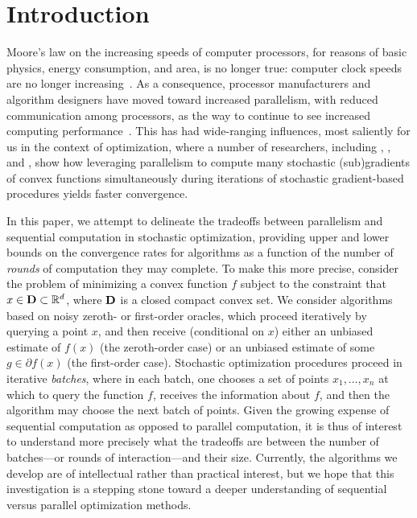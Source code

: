 
\section{Introduction}

Moore's law on the increasing speeds of computer processors, for reasons of
basic physics, energy consumption, and area, is no longer true: computer
clock speeds are no longer increasing~\citep{FullerMi11}. As a consequence,
processor manufacturers and algorithm designers have moved toward increased
parallelism, with reduced communication among processors, as the way to
continue to see increased computing performance~\citep{FullerMi11,
  BallardDeHoSc11}. This has had wide-ranging influences, most saliently for
us in the context of optimization, where a number of researchers, including
\citet{DekelGiShXi12}, \citet{DuchiBaWa12}, and \citet{NiuReReWr11},
show how leveraging parallelism to compute many stochastic (sub)gradients
of convex functions simultaneously during iterations of stochastic
gradient-based procedures yields faster convergence.

In this paper, we attempt to
delineate the tradeoffs between parallelism and sequential computation
in stochastic optimization, providing upper and lower bounds on the
convergence rates for algorithms as a
function of the number of \emph{rounds} of computation they may complete.
To make this more precise, consider the problem of minimizing a
convex function $f$ subject to the constraint that $x \in \mathbf{D} \subset
\mathbb{R}^d$, where $\mathbf{D}$ is a closed compact convex set. We consider
algorithms based on noisy zeroth- or first-order oracles, which proceed
iteratively by querying a point $x$, and then receive (conditional on $x$)
either an unbiased estimate of $f(x)$ (the zeroth-order case) or an unbiased
estimate of some $g \in \partial f(x)$ (the first-order case).  Stochastic
optimization procedures proceed in iterative \emph{batches}, where in each
batch, one chooses a set of points $x_1, \ldots, x_n$ at which to query the
function $f$, receives the information about $f$, and then the algorithm may
choose the next batch of points.  Given the growing expense of sequential
computation as opposed to parallel computation, it is thus of interest to
understand more precisely what the tradeoffs are between the number of
batches---or rounds of interaction---and their size. Currently, the
algorithms we develop are of intellectual rather than practical interest,
but we hope that this investigation is a stepping stone toward a deeper
understanding of sequential versus parallel optimization methods.

